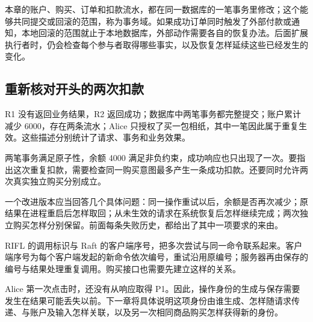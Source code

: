 本章的账户、购买、订单和扣款流水，都在同一数据库的一笔事务里修改；这个能够共同提交或回滚的范围，称为事务域。如果成功订单同时触发了外部付款或通知，本地回滚的范围就止于本地数据库，外部动作需要各自的恢复办法。后面扩展执行者时，仍会检查每个参与者取得哪些事实，以及恢复怎样延续这些已经发生的变化。

\subsection*{重新核对开头的两次扣款}

R1 没有返回业务结果，R2 返回成功；数据库中两笔事务都完整提交；账户累计减少 6000，存在两条流水；Alice 只授权了买一包相纸，其中一笔因此属于重复生效。这些描述分别统计了请求、事务和业务效果。

两笔事务满足原子性，余额 4000 满足非负约束，成功响应也只出现了一次。要指出这次重复扣款，需要检查同一购买意图最多产生一条成功扣款。还要同时允许两次真实独立购买分别成立。

一个改进版本应当回答几个具体问题：同一操作重试以后，余额是否再次减少；原结果在进程重启后怎样取回；从未生效的请求在系统恢复后怎样继续完成；两次独立购买怎样分别保留。前面每条失败历史，都给出了其中一项要求的来由。

RIFL 的调用标识与 Raft 的客户端序号，把多次尝试与同一命令联系起来。客户端序号为每个客户端发起的新命令依次编号，重试沿用原编号；服务器再由保存的编号与结果处理重复调用\cite{rifl,raft}。购买接口也需要先建立这样的关系。

Alice 第一次点击时，还没有从响应取得 P1。因此，操作身份的生成与保存需要发生在结果可能丢失以前。下一章将具体说明这项身份由谁生成、怎样随请求传递、与账户及输入怎样关联，以及另一次相同商品购买怎样获得新的身份。
\FloatBarrier
